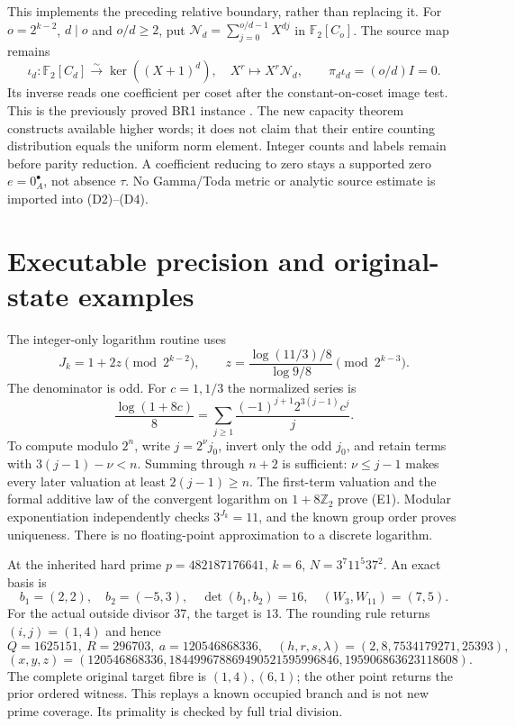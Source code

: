 This implements the preceding relative boundary, rather than replacing it.
For $o=2^{k-2}$, $d\mid o$ and $o/d\ge2$, put
$\mathcal N_d=\sum_{j=0}^{o/d-1}X^{dj}$ in $\mathbb F_2[C_o]$.
The source map remains
\[
 \iota_d:\mathbb F_2[C_d]\xrightarrow{\sim}\ker((X+1)^d),
 \quad X^r\mapsto X^r\mathcal N_d,
 \qquad \pi_d\iota_d=(o/d)I=0.                            \tag{D5}
\]
Its inverse reads one coefficient per coset after the constant-on-coset image
test. This is the previously proved BR1 instance
\cite[BR1--BR2]{SplitZero}\cite[(B1)--(B4)]{PriorRelative}.
The new capacity theorem constructs available higher words; it does not claim
that their entire counting distribution equals the uniform norm element.
Integer counts and labels remain before parity reduction. A coefficient
reducing to zero stays a supported zero $e=0_A^\bullet$, not absence $\tau$.
No Gamma/Toda metric or analytic source estimate is imported into (D2)--(D4).

\section{Executable precision and original-state examples}
The integer-only logarithm routine uses
\[
 J_k=1+2z\pmod{2^{k-2}},\qquad
 z=\frac{\log(11/3)/8}{\log9/8}\pmod{2^{k-3}}.             \tag{E1}
\]
The denominator is odd. For $c=1,1/3$ the normalized series is
\[
 \frac{\log(1+8c)}8
 =\sum_{j\ge1}\frac{(-1)^{j+1}2^{3(j-1)}c^j}{j}.          \tag{E2}
\]
To compute modulo $2^n$, write $j=2^\nu j_0$, invert only the odd $j_0$, and
retain terms with $3(j-1)-\nu<n$. Summing through $n+2$ is sufficient:
$\nu\le j-1$ makes every later valuation at least $2(j-1)\ge n$.
The first-term valuation and the formal additive law of the convergent
logarithm on $1+8\mathbb Z_2$ prove (E1). Modular exponentiation independently
checks $3^{J_k}=11$, and the known group order proves uniqueness.
There is no floating-point approximation to a discrete logarithm.

At the inherited hard prime $p=482187176641$, $k=6$,
$N=3^7 11^5 37^2$. An exact basis is
\[
 b_1=(2,2),\quad b_2=(-5,3),\quad\det(b_1,b_2)=16,
 \quad(W_3,W_{11})=(7,5).
\]
For the actual outside divisor $37$, the target is $13$. The rounding rule
returns $(i,j)=(1,4)$ and hence
\[
 Q=1625151,\ R=296703,\ a=120546868336,
 \quad(h,r,s,\lambda)=(2,8,7534179271,25393),
\]
\[
 (x,y,z)=(120546868336,184499678869490521595996846,195906863623118608).
\]
The complete original target fibre is $(1,4),(6,1)$; the other point returns
the prior ordered witness. This replays a known occupied branch and is not
new prime coverage. Its primality is checked by full trial division.

